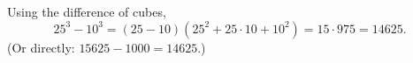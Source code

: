 Using the difference of cubes,
\[25^3-10^3=(25-10)\left(25^2+25\cdot10+10^2\right)=15\cdot975=\boxed{14625}.\]
(Or directly: $15625-1000=14625$.)
